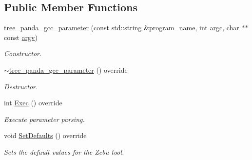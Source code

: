 \subsection*{Public Member Functions}
\begin{DoxyCompactItemize}
\item 
\hyperlink{classtree__panda__gcc__parameter_a29a9274bc3040a0002ac52e882bff585}{tree\+\_\+panda\+\_\+gcc\+\_\+parameter} (const std\+::string \&program\+\_\+name, int \hyperlink{classParameter_a76b21c2ed27f73883401229217020814}{argc}, char $\ast$$\ast$const \hyperlink{classParameter_a538da2e132ca91996baa116097d6238f}{argv})
\begin{DoxyCompactList}\small\item\em Constructor. \end{DoxyCompactList}\item 
\hyperlink{classtree__panda__gcc__parameter_a66bc6cffdf5df44710b31ec65caf27c1}{$\sim$tree\+\_\+panda\+\_\+gcc\+\_\+parameter} () override
\begin{DoxyCompactList}\small\item\em Destructor. \end{DoxyCompactList}\item 
int \hyperlink{classtree__panda__gcc__parameter_a059ff6cba08daf6710ffa46b2c97e2ee}{Exec} () override
\begin{DoxyCompactList}\small\item\em Execute parameter parsing. \end{DoxyCompactList}\item 
void \hyperlink{classtree__panda__gcc__parameter_a2064bc94ae2751a0e420a60e2024fcbc}{Set\+Defaults} () override
\begin{DoxyCompactList}\small\item\em Sets the default values for the Zebu tool. \end{DoxyCompactList}\end{DoxyCompactItemize}
